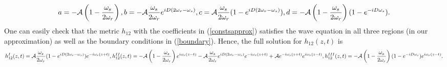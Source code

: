 \documentclass[12pt]{article}
\def\\{\hfill\break} \let\==\equiv
\begin{document}
\begin{equation}\label{constsapprox}
    \begin{split}
        a = - \mathcal{A} \left(1-\frac{\omega_s}{2 \omega_r}\right),\\
        b = - \mathcal{A} \frac{\omega_s}{2 \omega_r} e^{iD(2\omega_r-\omega_s)}, \\
        c = \mathcal{A} \frac{\omega_s}{2\omega_r}(1-e^{iD(2\omega_r -\omega_s)}), \\
        d = - \mathcal{A} \left(1-\frac{\omega_s}{2\omega_r}\right)(1-e^{-iD\omega_s}).
    \end{split}
\end{equation}
One can easily check that the metric $h_{12}$ with the coefficients in (\ref{constsapprox}) satisfies the wave equation in all three regions (in our approximation) as well as the boundary conditions in (\ref{boundary}). Hence, the full solution for $h_{12}(z,t)$ is
\begin{equation}\label{hfull}
    \begin{split}
        h_{12}^I(z,t) = \mathcal{A} \frac{\omega_s}{2\omega_r}(1-e^{iD(2\omega_r-\omega_s)}) e^{-i\omega_r(z+t)}, \\
        h_{12}^{II}(z,t) = - \mathcal{A} \left(1-\frac{\omega_s}{2\omega_r}\right) e^{i\omega_r(z-t)} - \mathcal{A} \frac{\omega_s}{2\omega_r} e^{iD(2\omega_r-\omega_s)}e^{-i\omega_r(z+t)} \\
        + \mathcal{A} e^{-i\omega_s(z+t)}e^{i\omega_r(z-t)}, \\
        h_{12}^{III}(z,t) = - \mathcal{A} \left(1-\frac{\omega_s}{2\omega_r}\right)(1-e^{-iD\omega_s}) e^{i\omega_r(z-t)}.
    \end{split}
\end{equation}
\end{document}
